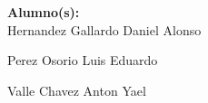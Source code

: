 {\begin{center}
\begin{center}
			 \LARGE	{ \textbf{Alumno(s):}}\\%
	 
			 \normalsize	 {Hernandez Gallardo Daniel Alonso}
			 
			 \vspace{-0.5cm}
			 
			 \normalsize		{Perez Osorio Luis Eduardo}
			 
			 \vspace{-0.5cm}
			 
			 \normalsize		{Valle Chavez Anton Yael}

			 
					 \vspace{1.25cm}
					 \vspace{0.9cm}
					 
				 \end{center}
		 
			 \end{center} 
}

